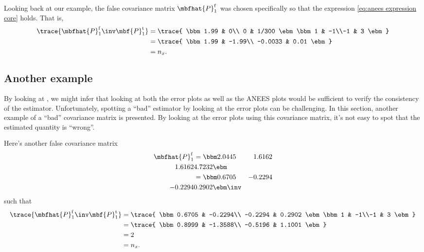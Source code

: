 \documentclass{simple-article}
\begin{document}
Looking back at our example, the false covariance matrix $\mbfhat{P}_{1}^{\mathrm{f}}$ was chosen specifically so that the expression \eqref{eq:anees expression core} holds. That is,
\begin{align}
  \trace{{\mbfhat{P}_{1}^{\mathrm{f}}}\inv\mbf{P}_{1}^{\mathrm{t}}}
        &= \trace{
          \bbm 1.99 & 0\\ 0 & 1/300 \ebm
          \bbm 1 & -1\\-1 & 3 \ebm
        }\\
        &= \trace{
          \bbm 
          1.99 &  -1.99\\
          -0.0033  &  0.01
          \ebm
        }\\
        &= n_{x}.
\end{align}


\subsection{Another example}
By looking at , we might infer that looking at both the error plots  as well as the ANEES plots  would be sufficient to verify the consistency of the estimator. Unfortunately, spotting a ``bad'' estimator by looking at the error plots can be challenging. In this section, another example of a ``bad'' covariance matrix is presented. By looking at the error plots using this covariance matrix, it's not easy to spot that the estimated quantity is ``wrong''.

Here's another false covariance matrix
\begin{align}
  \mbfhat{P}_{1}^{\mathrm{f}} &= 
  \label{eq:false covariance 2}
  \bbm 
  2.0445   & 1.6162\\
  1.6162   & 4.7232
  \ebm\\
           &= \bbm 
  0.6705  & -0.2294\\
  -0.2294 &   0.2902
  \ebm\inv
\end{align}
such that
\begin{align}
  \trace{{\mbfhat{P}_{1}^{\mathrm{f}}}\inv\mbf{P}_{1}^{\mathrm{t}}}
        &= \trace{
          \bbm 
          0.6705  & -0.2294\\
          -0.2294 &   0.2902
          \ebm
          \bbm 1 & -1\\-1 & 3 \ebm
        }\\
        &= \trace{
          \bbm 
          0.8999  & -1.3588\\
          -0.5196 &   1.1001
          \ebm
        }\\
        &= 2\\
        &= n_{x}.
\end{align}
\end{document}
